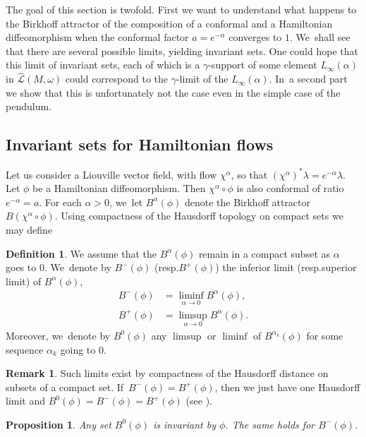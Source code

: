 \documentclass[10pt]{amsart}
\newtheorem{prop}[thm]{Proposition}
\theoremstyle{definition}
\newtheorem{defn}[thm]{Definition}
\newtheorem{rem}[thm]{Remark}
\newcommand {\LL}{{\mathcal L}}
\providecommand{\resp}{resp.}\providecommand{\cf}{cf.}
\begin{document}
The goal of this section is twofold. First we want to understand what happens to the Birkhoff attractor of the composition of a conformal and a
Hamiltonian diffeomorphism when the conformal factor $a=e^{-\alpha}$ converges to $1$. We~shall see that there are several possible limits, yielding invariant sets. One could hope that this
limit of invariant sets, each of which is a $\gamma$\nobreakdash-support of some element $L_\infty(\alpha)$ in $\widehat{\LL} (M,\omega)$ could correspond to the $\gamma$\nobreakdash-limit of the $L_\infty(\alpha)$. In~a second part we show that this is unfortunately not the case even in the simple case of the pendulum.
\subsection{Invariant sets for Hamiltonian flows}
Let us consider a Liouville vector field, with flow $\chi^\alpha$, so that $(\chi^\alpha)^*\lambda=e^{-\alpha} \lambda$. Let $\phi$ be a Hamiltonian diffeomorphism. Then $\chi^\alpha\circ \phi$ is also conformal of ratio $e^{-\alpha}=a$. For each $\alpha>0$, we~let $B^\alpha(\phi)$ denote the Birkhoff attractor $B(\chi^\alpha\circ \phi)$. Using compactness of the Hausdorff topology on compact sets we may define

\begin{defn} We assume that the $B^\alpha(\phi)$ remain in a compact subset as $\alpha$ goes to $0$. We~denote by $B^-(\phi)$ (\resp $B^+(\phi)$) the inferior limit (\resp superior limit) of $B_{}^\alpha(\phi)$, \ie
\begin{align*}
B^-(\phi)&=\liminf_{\alpha\to 0}B^\alpha(\phi),
\\
B^+(\phi)&=\limsup_{\alpha\to 0}B^\alpha(\phi).
\end{align*}
Moreover, we~denote by $B^0(\phi)$
any $\limsup$ or $\liminf$ of $B^{\alpha_k}(\phi)$ for some sequence $\alpha_k$ going to $0$.
\end{defn}

\begin{rem}
Such limits exist by compactness of the Hausdorff distance on subsets of a compact set. If~$B^-(\phi)=B^+(\phi)$, then
we just have one Hausdorff limit and $B^0(\phi)=B^-(\phi)=B^+(\phi) $ (see \cite[p.\,26, Exer.\,4.23 \& 4.24]{Kechris}).
\end{rem}

\begin{prop} Any set $B^0(\phi)$ is invariant by $\phi$. The same holds for $B^-(\phi)$.
\end{prop}
\end{document}
